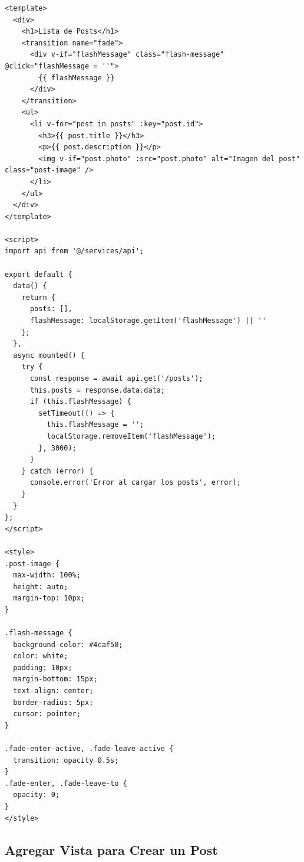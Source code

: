 \documentclass[11pt]{article}
\begin{document}
\begin{verbatim}
<template>
  <div>
    <h1>Lista de Posts</h1>
    <transition name="fade">
      <div v-if="flashMessage" class="flash-message" @click="flashMessage = ''">
        {{ flashMessage }}
      </div>
    </transition>
    <ul>
      <li v-for="post in posts" :key="post.id">
        <h3>{{ post.title }}</h3>
        <p>{{ post.description }}</p>
        <img v-if="post.photo" :src="post.photo" alt="Imagen del post" class="post-image" />
      </li>
    </ul>
  </div>
</template>

<script>
import api from '@/services/api';

export default {
  data() {
    return {
      posts: [],
      flashMessage: localStorage.getItem('flashMessage') || ''
    };
  },
  async mounted() {
    try {
      const response = await api.get('/posts');
      this.posts = response.data.data;
      if (this.flashMessage) {
        setTimeout(() => {
          this.flashMessage = '';
          localStorage.removeItem('flashMessage');
        }, 3000);
      }
    } catch (error) {
      console.error('Error al cargar los posts', error);
    }
  }
};
</script>

<style>
.post-image {
  max-width: 100%;
  height: auto;
  margin-top: 10px;
}

.flash-message {
  background-color: #4caf50;
  color: white;
  padding: 10px;
  margin-bottom: 15px;
  text-align: center;
  border-radius: 5px;
  cursor: pointer;
}

.fade-enter-active, .fade-leave-active {
  transition: opacity 0.5s;
}
.fade-enter, .fade-leave-to {
  opacity: 0;
}
</style>
\end{verbatim}

\subsection{Agregar Vista para Crear un Post}
\label{sec:orgb93e7e2}
\end{document}
